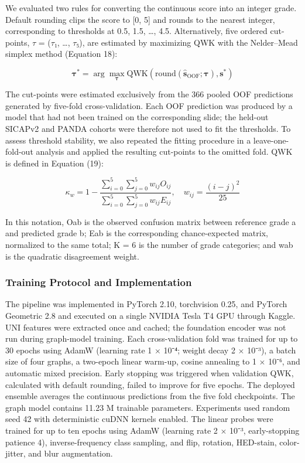 \documentclass[11pt,a4paper]{article}
\begin{document}
We evaluated two rules for converting the continuous score into an integer grade. Default rounding clips the score to [0, 5] and rounds to the nearest integer, corresponding to thresholds at 0.5, 1.5, …, 4.5. Alternatively, five ordered cut-points, $\tau$ = ($\tau$₁, …, $\tau$₅), are estimated by maximizing QWK with the Nelder--Mead simplex method \cite{ref27} (Equation 18):


\begin{equation}
\boldsymbol{\tau}^* = \arg\max_{\boldsymbol{\tau}} \text{QWK}\left(\text{round}(\hat{\mathbf{s}}_{\text{OOF}}; \boldsymbol{\tau}), \mathbf{s}^*\right)
\label{eq:threshold_cal}
\end{equation}

The cut-points were estimated exclusively from the 366 pooled OOF predictions generated by five-fold cross-validation. Each OOF prediction was produced by a model that had not been trained on the corresponding slide; the held-out SICAPv2 and PANDA cohorts were therefore not used to fit the thresholds. To assess threshold stability, we also repeated the fitting procedure in a leave-one-fold-out analysis and applied the resulting cut-points to the omitted fold. QWK \cite{ref11} is defined in Equation (19):


\begin{equation}
\kappa_w = 1 - \frac{\sum_{i=0}^5 \sum_{j=0}^5 w_{ij} O_{ij}}{\sum_{i=0}^5 \sum_{j=0}^5 w_{ij} E_{ij}}, \quad w_{ij} = \frac{(i - j)^2}{25}
\label{eq:qwk}
\end{equation}

In this notation, Oab is the observed confusion matrix between reference grade a and predicted grade b; Eab is the corresponding chance-expected matrix, normalized to the same total; K = 6 is the number of grade categories; and wab is the quadratic disagreement weight.


\subsubsection{Training Protocol and Implementation}
The pipeline was implemented in PyTorch 2.10, torchvision 0.25, and PyTorch Geometric 2.8 and executed on a single NVIDIA Tesla T4 GPU through Kaggle. UNI features were extracted once and cached; the foundation encoder was not run during graph-model training. Each cross-validation fold was trained for up to 30 epochs using AdamW (learning rate 1 $\times$ 10⁻⁴; weight decay 2 $\times$ 10⁻³), a batch size of four graphs, a two-epoch linear warm-up, cosine annealing to 1 $\times$ 10⁻⁶, and automatic mixed precision. Early stopping was triggered when validation QWK, calculated with default rounding, failed to improve for five epochs. The deployed ensemble averages the continuous predictions from the five fold checkpoints. The graph model contains 11.23 M trainable parameters. Experiments used random seed 42 with deterministic cuDNN kernels enabled. The linear probes were trained for up to ten epochs using AdamW (learning rate 2 $\times$ 10⁻³, early-stopping patience 4), inverse-frequency class sampling, and flip, rotation, HED-stain, color-jitter, and blur augmentation.
\end{document}

